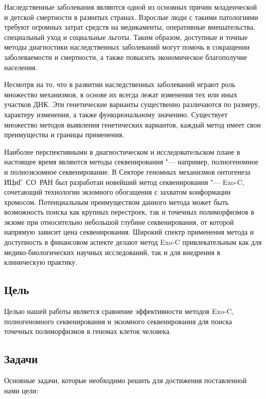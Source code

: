 \documentclass[a4paper,14pt]{extarticle}
\begin{document}
Наследственные заболевания являются одной из основных причин младенческой и детской смертности в развитых странах.
Взрослые люди с такими патологиями требуют огромных затрат средств на медикаменты, оперативные вмешательства, специальный уход и социальные льготы.
Таким образом, доступные и точные методы диагностики наследственных заболеваний могут помочь в сокращении заболеваемости и смертности, а также повысить экономическое благополучие населения.

Несмотря на то, что в развитии наследственных заболеваний играют роль множество механизмов, в основе их всегда лежат изменения тех или иных участков ДНК.
Эти генетические варианты существенно различаются по размеру, характеру изменения, а также функциональному значению.
Существует множество методов выявления генетических вариантов, каждый метод имеет свои преимущества и границы применения.

Наиболее перспективными в диагностическом и исследовательском пла\-не в настоящее время являются методы секвенирования "--- например, полногеномное и полноэкзомное секвенирование.
В Секторе геномных механизмов онтогенеза ИЦиГ~СО~РАН был разработан новейший метод секвенирования "--- Exo-C, сочетающий технологии экзомного обогащения с захватом конформации хромосом.
Потенциальным преимуществом данного метода может быть возможность поиска как крупных перестроек, так и точечных полиморфизмов в экзоме при относительно небольшой глубине секвенирования, от которой напрямую зависит цена секвенирования.
Широкий спектр применения метода и доступность в финансовом аспекте делают метод Exo-C привлекательным как для медико-биологических научных исследований, так и для внедрения в клиническую практику.

\subsection*{Цель}

Целью нашей работы является сравнение эффективности методов Exo-C, полногеномного секвенирования и экзомного секвенирования для поиска точечных полиморфизмов в геномах клеток человека.

\subsection*{Задачи}

Основные задачи, которые необходимо решить для достижения поставленной нами цели:
\end{document}
